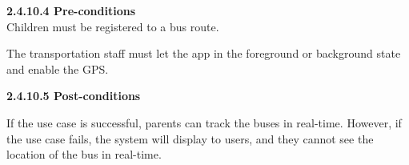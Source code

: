 \indent\textbf{2.4.10.4 Pre-conditions}\\
\indent\indent Children must be registered to a bus route.
\vspace{0.25em}
\par\indent\indent\parbox{0.9\textwidth}{
    The transportation staff must let the app in the foreground or background state and enable the GPS.
}

\vspace{1em}
\indent\textbf{2.4.10.5 Post-conditions}\\
\vspace{-0.7em}
\par\indent\indent\parbox{0.9\textwidth}{
    If the use case is successful, parents can track the buses in real-time. However, if the use case fails, the system will display to users, and they cannot see the location of the bus in real-time.
}\\




